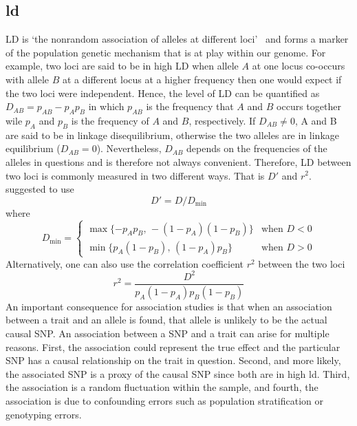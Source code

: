 \subsection{\acrfull{ld}}
\label{sub:linkage_disequilibrium}

LD is `the nonrandom association of alleles at different loci'~\cite{Slatkin2008} and forms a marker of the population genetic mechanism that is at play within our genome.
For example, two loci are said to be in high LD when allele $A$ at one locus co-occurs with allele $B$ at a different locus at a higher frequency then one would expect if the two loci were independent.
Hence, the level of LD can be quantified as $D_{AB}=p_{AB}-p_{A}p_{B}$ in which $p_{AB}$ is the frequency that $A$ and $B$ occurs together wile $p_A$ and $p_B$ is the frequency of $A$ and $B$, respectively.
If $D_{AB} \neq 0$, A and B are said to be in linkage disequilibrium, otherwise the two alleles are in linkage equilibrium ($D_{AB}=0$).
Nevertheless, $D_{AB}$ depends on the frequencies of the alleles in questions and is therefore not always convenient.
Therefore, LD between two loci is commonly measured in two different ways. 
That is $D'$ and $r^2$.
\citet{Lewontin1964} suggested to use
\begin{equation}\label{eq:dprime}
  D' = D/D_{\min}
\end{equation}
where 
\begin{equation*}
  D_{\min}= \begin{cases}
    \max\{-p_A p_B,\,-(1-p_A)(1-p_B)\} & \text{when } D < 0\\
    \min\{p_A (1-p_B),\,(1-p_A) p_B\} & \text{when } D > 0
  \end{cases} 
\end{equation*}
Alternatively, one can also use the correlation coefficient $r^2$ between the two loci 
\begin{equation}\label{eq:r2}
  r^2=\frac{D^2}{p_A(1-p_A)p_B (1-p_B)}
\end{equation}
An important consequence for association studies is that when an association between a trait and an allele is found, that allele is unlikely to be the actual causal SNP\@.
An association between a SNP and a trait can arise for multiple reasons.
First, the association could represent the true effect and the particular SNP has a causal relationship on the trait in question.
Second, and more likely, the associated SNP is a proxy of the causal SNP since both are in high \acrshort{ld}.
Third, the association is a random fluctuation within the sample, and 
fourth, the association is due to confounding errors such as population stratification or genotyping errors.

